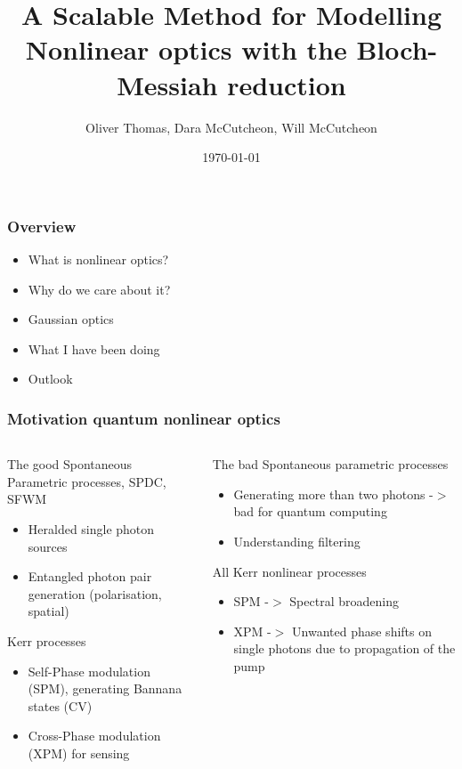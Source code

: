 \documentclass{beamer}
\title{A Scalable Method for Modelling Nonlinear optics with the Bloch-Messiah reduction}
\author{Oliver Thomas, Dara McCutcheon, Will McCutcheon}
\institute{Quantum Engineering CDT \\ University of Bristol}
\date{\today}
\begin{document}
\frame{\titlepage}

\begin{frame}
\frametitle{Overview}
\begin{itemize}
    \item What is nonlinear optics?
    \item Why do we care about it?
    \item Gaussian optics
    \item What I have been doing
    \item Outlook
\end{itemize}
\end{frame}

\begin{frame}
\frametitle{Motivation quantum nonlinear optics}
\begin{columns}
    \begin{block}{The good}
    Spontaneous Parametric processes, SPDC, SFWM
    \begin{itemize}
        \item Heralded single photon sources
        \item Entangled photon pair generation (polarisation, spatial)
    \end{itemize}
    Kerr processes 
    \begin{itemize}
        \item Self-Phase modulation (SPM), generating Bannana states (CV)
        \item Cross-Phase modulation (XPM) for sensing
    \end{itemize}
    \end{block}
%
    \begin{block}{The bad}
        Spontaneous parametric processes
        \begin{itemize}
            \item Generating more than two photons -$>$ bad for quantum computing
            \item Understanding filtering
        \end{itemize}
        All Kerr nonlinear processes 
        \begin{itemize}
            \item SPM -$>$ Spectral broadening
            \item XPM -$>$ Unwanted phase shifts on single photons due to propagation of the pump 
        \end{itemize}
        \end{block}
\end{columns}

\end{frame}
\end{document}

